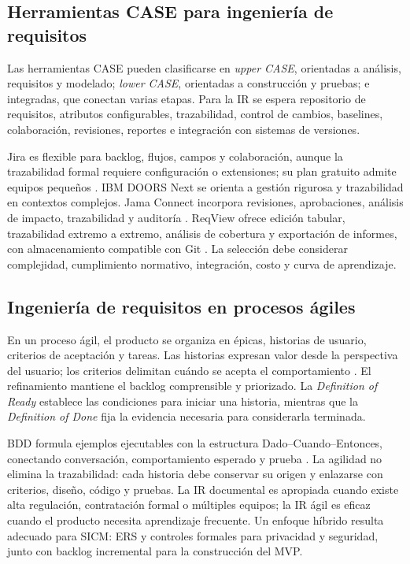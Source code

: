 \documentclass[11pt,a4paper]{article}
\begin{document}
	\subsection{Herramientas CASE para ingeniería de requisitos}
	Las herramientas CASE pueden clasificarse en \textit{upper CASE}, orientadas a análisis, requisitos y modelado; \textit{lower CASE}, orientadas a construcción y pruebas; e integradas, que conectan varias etapas. Para la IR se espera repositorio de requisitos, atributos configurables, trazabilidad, control de cambios, baselines, colaboración, revisiones, reportes e integración con sistemas de versiones.
	
	Jira es flexible para backlog, flujos, campos y colaboración, aunque la trazabilidad formal requiere configuración o extensiones; su plan gratuito admite equipos pequeños \cite{jiraPricing}. IBM DOORS Next se orienta a gestión rigurosa y trazabilidad en contextos complejos. Jama Connect incorpora revisiones, aprobaciones, análisis de impacto, trazabilidad y auditoría \cite{jamaFeatures}. ReqView ofrece edición tabular, trazabilidad extremo a extremo, análisis de cobertura y exportación de informes, con almacenamiento compatible con Git \cite{reqviewOfficial}. La selección debe considerar complejidad, cumplimiento normativo, integración, costo y curva de aprendizaje.
	
	\subsection{Ingeniería de requisitos en procesos ágiles}
	En un proceso ágil, el producto se organiza en épicas, historias de usuario, criterios de aceptación y tareas. Las historias expresan valor desde la perspectiva del usuario; los criterios delimitan cuándo se acepta el comportamiento \cite{cohn2004}. El refinamiento mantiene el backlog comprensible y priorizado. La \textit{Definition of Ready} establece las condiciones para iniciar una historia, mientras que la \textit{Definition of Done} fija la evidencia necesaria para considerarla terminada.
	
	BDD formula ejemplos ejecutables con la estructura Dado--Cuando--Entonces, conectando conversación, comportamiento esperado y prueba \cite{smart2014}. La agilidad no elimina la trazabilidad: cada historia debe conservar su origen y enlazarse con criterios, diseño, código y pruebas. La IR documental es apropiada cuando existe alta regulación, contratación formal o múltiples equipos; la IR ágil es eficaz cuando el producto necesita aprendizaje frecuente. Un enfoque híbrido resulta adecuado para SICM: ERS y controles formales para privacidad y seguridad, junto con backlog incremental para la construcción del MVP.
	
\end{document}
